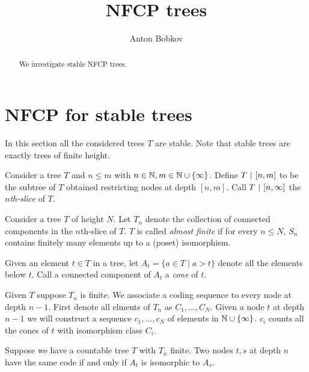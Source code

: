 \documentclass{amsart}
\begin{document}
\title{NFCP trees}
\author{Anton Bobkov}

\begin{abstract}
	We investigate stable NFCP trees. 
\end{abstract}

\maketitle

\section{NFCP for stable trees}
In this section all the considered trees $T$ are stable. Note that stable trees are exactly trees of finite height.

\begin{Definition}
Consider a tree $T$ and $n \leq m$ with $n \in \mathbb{N}, m \in \mathbb{N} \cup \{\infty\}$. Define $T \upharpoonright [n,m]$ to be the subtree of $T$ obtained restricting nodes at depth $[n,m]$. Call $T \upharpoonright [n, \infty]$ the \emph{$n$th-slice} of $T$.
\end{Definition}

\begin{Definition}
	Consider a tree $T$ of height $N$. Let $T_n$ denote the collection of connected components in the $n$th-slice of $T$. $T$ is called \emph{almost finite} if for every $n \leq N$, $S_n$ contains finitely many elements up to a (poset) isomorphism.
\end{Definition}

\begin{Definition}
	Given an element $t \in T$ in a tree, let $A_t = \{a \in T \mid a > t\}$ denote all the elements below $t$. Call a connected component of $A_t$ a \emph{cone} of $t$.
\end{Definition}

Given $T$ suppose $T_n$ is finite. We associate a coding sequence to every node at depth $n-1$. First denote all elments of $T_n$ as $C_1, \ldots, C_N$. Given a node $t$ at depth $n-1$ we will construct a sequence $c_1, \ldots, c_N$ of elements in $\mathbb{N} \cup \{\infty\}$. $c_i$ counts all the cones of $t$ with isomorphism class $C_i$.

\begin{Lemma} \label{lm_tree_code}
	Suppose we have a countable tree $T$ with $T_n$ finite. Two nodes $t,s$ at depth $n$ have the same code if and only if $A_t$ is isomorphic to $A_s$.
\end{Lemma}
\end{document}
